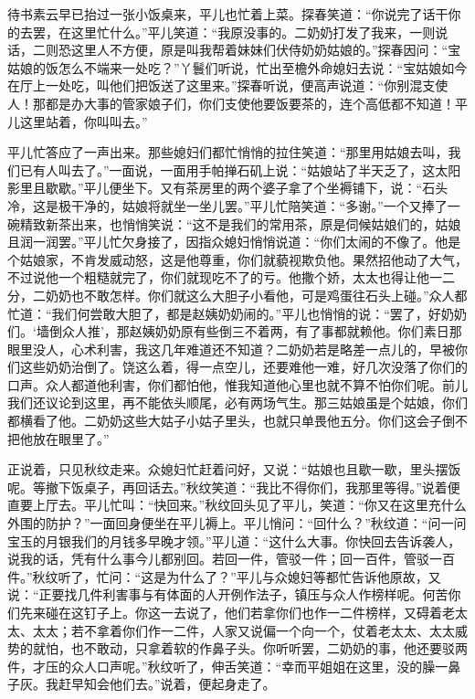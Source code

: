待书素云早已抬过一张小饭桌来，平儿也忙着上菜。探春笑道：“你说完了话干你的去罢，在这里忙什么。”平儿笑道：“我原没事的。二奶奶打发了我来，一则说话，二则恐这里人不方便，原是叫我帮着妹妹们伏侍奶奶姑娘的。”探春因问：“宝姑娘的饭怎么不端来一处吃？”丫鬟们听说，忙出至檐外命媳妇去说：“宝姑娘如今在厅上一处吃，叫他们把饭送了这里来。”探春听说，便高声说道：“你别混支使人！那都是办大事的管家娘子们，你们支使他要饭要茶的，连个高低都不知道！平儿这里站着，你叫叫去。”

平儿忙答应了一声出来。那些媳妇们都忙悄悄的拉住笑道：“那里用姑娘去叫，我们已有人叫去了。”一面说，一面用手帕掸石矶上说：“姑娘站了半天乏了，这太阳影里且歇歇。”平儿便坐下。又有茶房里的两个婆子拿了个坐褥铺下，说：“石头冷，这是极干净的，姑娘将就坐一坐儿罢。”平儿忙陪笑道：“多谢。”一个又捧了一碗精致新茶出来，也悄悄笑说：“这不是我们的常用茶，原是伺候姑娘们的，姑娘且润一润罢。”平儿忙欠身接了，因指众媳妇悄悄说道：“你们太闹的不像了。他是个姑娘家，不肯发威动怒，这是他尊重，你们就藐视欺负他。果然招他动了大气，不过说他一个粗糙就完了，你们就现吃不了的亏。他撒个娇，太太也得让他一二分，二奶奶也不敢怎样。你们就这么大胆子小看他，可是鸡蛋往石头上碰。”众人都忙道：“我们何尝敢大胆了，都是赵姨奶奶闹的。”平儿也悄悄的说：“罢了，好奶奶们。‘墙倒众人推’，那赵姨奶奶原有些倒三不着两，有了事都就赖他。你们素日那眼里没人，心术利害，我这几年难道还不知道？二奶奶若是略差一点儿的，早被你们这些奶奶治倒了。饶这么着，得一点空儿，还要难他一难，好几次没落了你们的口声。众人都道他利害，你们都怕他，惟我知道他心里也就不算不怕你们呢。前儿我们还议论到这里，再不能依头顺尾，必有两场气生。那三姑娘虽是个姑娘，你们都横看了他。二奶奶这些大姑子小姑子里头，也就只单畏他五分。你们这会子倒不把他放在眼里了。”

正说着，只见秋纹走来。众媳妇忙赶着问好，又说：“姑娘也且歇一歇，里头摆饭呢。等撤下饭桌子，再回话去。”秋纹笑道：“我比不得你们，我那里等得。”说着便直要上厅去。平儿忙叫：“快回来。”秋纹回头见了平儿，笑道：“你又在这里充什么外围的防护？”一面回身便坐在平儿褥上。平儿悄问：“回什么？”秋纹道：“问一问宝玉的月银我们的月钱多早晚才领。”平儿道：“这什么大事。你快回去告诉袭人，说我的话，凭有什么事今儿都别回。若回一件，管驳一件；回一百件，管驳一百件。”秋纹听了，忙问：“这是为什么了？”平儿与众媳妇等都忙告诉他原故，又说：“正要找几件利害事与有体面的人开例作法子，镇压与众人作榜样呢。何苦你们先来碰在这钉子上。你这一去说了，他们若拿你们也作一二件榜样，又碍着老太太、太太；若不拿着你们作一二件，人家又说偏一个向一个，仗着老太太、太太威势的就怕，也不敢动，只拿着软的作鼻子头。你听听罢，二奶奶的事，他还要驳两件，才压的众人口声呢。”秋纹听了，伸舌笑道：“幸而平姐姐在这里，没的臊一鼻子灰。我赶早知会他们去。”说着，便起身走了。

